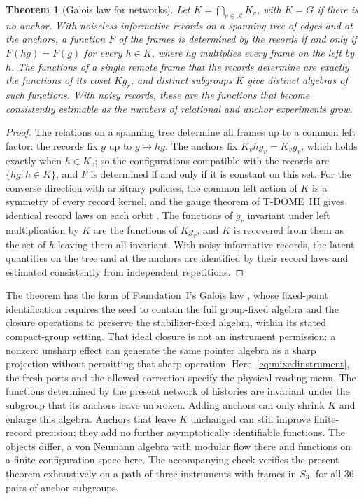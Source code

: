 \documentclass[11pt,a4paper]{article}
\newtheorem{theorem}[definition]{Theorem}
\begin{document}
\begin{theorem}[Galois law for networks]\label{thm:galois}
Let $K=\bigcap_{v\in\mathcal A}K_v$, with $K=G$ if there is no anchor. With noiseless informative records on a spanning tree of edges and at the anchors, a function $F$ of the frames is determined by the records if and only if $F(hg)=F(g)$ for every $h\in K$, where $hg$ multiplies every frame on the left by $h$. The functions of a single remote frame that the records determine are exactly the functions of its coset $Kg_r$, and distinct subgroups $K$ give distinct algebras of such functions. With noisy records, these are the functions that become consistently estimable as the numbers of relational and anchor experiments grow.
\end{theorem}
\begin{proof}
The relations on a spanning tree determine all frames up to a common left factor: the records fix $g$ up to $g\mapsto hg$. The anchors fix $K_vhg_v=K_vg_v$, which holds exactly when $h\in K_v$; so the configurations compatible with the records are $\{hg:h\in K\}$, and $F$ is determined if and only if it is constant on this set. For the converse direction with arbitrary policies, the common left action of $K$ is a symmetry of every record kernel, and the gauge theorem of T-DOME~III gives identical record laws on each orbit \cite{TDOMEIII}. The functions of $g_r$ invariant under left multiplication by $K$ are the functions of $Kg_r$, and $K$ is recovered from them as the set of $h$ leaving them all invariant. With noisy informative records, the latent quantities on the tree and at the anchors are identified by their record laws and estimated consistently from independent repetitions.
\end{proof}

The theorem has the form of Foundation~I's Galois law \cite{FoundationI}, whose fixed-point identification requires the seed to contain the full group-fixed algebra and the closure operations to preserve the stabilizer-fixed algebra, within its stated compact-group setting. That ideal closure is not an instrument permission: a nonzero unsharp effect can generate the same pointer algebra as a sharp projection without permitting that sharp operation. Here~\eqref{eq:mixedinstrument}, the fresh ports and the allowed correction specify the physical reading menu. The functions determined by the present network of histories are invariant under the subgroup that its anchors leave unbroken. Adding anchors can only shrink $K$ and enlarge this algebra. Anchors that leave $K$ unchanged can still improve finite-record precision; they add no further asymptotically identifiable functions. The objects differ, a von Neumann algebra with modular flow there and functions on a finite configuration space here. The accompanying check verifies the present theorem exhaustively on a path of three instruments with frames in $S_3$, for all $36$ pairs of anchor subgroups.
\end{document}
